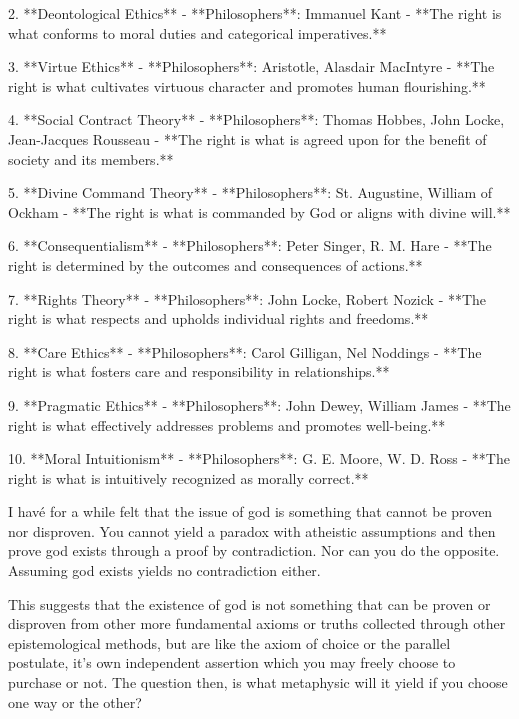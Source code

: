 2. **Deontological Ethics**  
   - **Philosophers**: Immanuel Kant  
   - **The right is what conforms to moral duties and categorical imperatives.**

3. **Virtue Ethics**  
   - **Philosophers**: Aristotle, Alasdair MacIntyre  
   - **The right is what cultivates virtuous character and promotes human flourishing.**

4. **Social Contract Theory**  
   - **Philosophers**: Thomas Hobbes, John Locke, Jean-Jacques Rousseau  
   - **The right is what is agreed upon for the benefit of society and its members.**

5. **Divine Command Theory**  
   - **Philosophers**: St. Augustine, William of Ockham  
   - **The right is what is commanded by God or aligns with divine will.**

6. **Consequentialism**  
   - **Philosophers**: Peter Singer, R. M. Hare  
   - **The right is determined by the outcomes and consequences of actions.**

7. **Rights Theory**  
   - **Philosophers**: John Locke, Robert Nozick  
   - **The right is what respects and upholds individual rights and freedoms.**

8. **Care Ethics**  
   - **Philosophers**: Carol Gilligan, Nel Noddings  
   - **The right is what fosters care and responsibility in relationships.**

9. **Pragmatic Ethics**  
   - **Philosophers**: John Dewey, William James  
   - **The right is what effectively addresses problems and promotes well-being.**

10. **Moral Intuitionism**  
    - **Philosophers**: G. E. Moore, W. D. Ross  
    - **The right is what is intuitively recognized as morally correct.**



    I havé for a while felt that the issue of god is something that cannot be proven nor disproven. You cannot yield a paradox with atheistic assumptions and then prove god exists through a proof by contradiction. Nor can you do the opposite. Assuming god exists yields no contradiction either. 

This suggests that the existence of god is not something that can be proven or disproven from other more fundamental axioms or truths collected through other epistemological methods, but are like the axiom of choice or the parallel postulate, it’s own independent assertion which you may freely choose to purchase or not. The question then, is what metaphysic will it yield if you choose one way or the other? 



